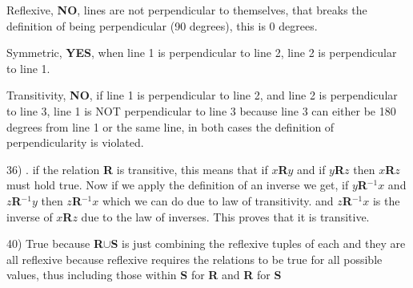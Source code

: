 \documentclass[11pt]{article}
\newcommand*{\mybox}[1]{\framebox{#1}}
\begin{document}
\begin{flushleft}
Reflexive, \textbf{NO}, lines are not perpendicular to themselves, that breaks the definition of being perpendicular (90 degrees), this is 0 degrees.

\vspace{2mm}

Symmetric, \textbf{YES}, when line 1 is perpendicular to line 2, line 2 is perpendicular to line 1.

\vspace{2mm}

Transitivity, \textbf{NO}, if line 1 is perpendicular to line 2, and line 2 is perpendicular to line 3, line 1 is NOT perpendicular to line 3 because line 3 can either be 180 degrees from line 1 or the same line, in both cases the definition of perpendicularity is violated.

\hrulefill

36) \mybox{\textbf{TRUE}}. if the relation \textbf{R} is transitive, this means that if $x$\textbf{R}$y$ and if $y$\textbf{R}$z$ then $x$\textbf{R}$z$ must hold true. Now if we apply the definition of an inverse we get, if  $y$\textbf{R}$^{-1}x$ and $z$\textbf{R}$^{-1}y$ then $z$\textbf{R}$^{-1}x$ which we can do due to law of transitivity. and $z$\textbf{R}$^{-1}x$ is the inverse of $x$\textbf{R}$z$ due to the law of inverses. This proves that it is transitive.

\hrulefill

40) True because \textbf{R}$\cup$\textbf{S} is just combining the reflexive tuples of each and they are all reflexive because reflexive requires the relations to be true for all possible values, thus including those within \textbf{S} for \textbf{R} and \textbf{R} for \textbf{S}


\hrulefill

\end{flushleft}
\end{document}
